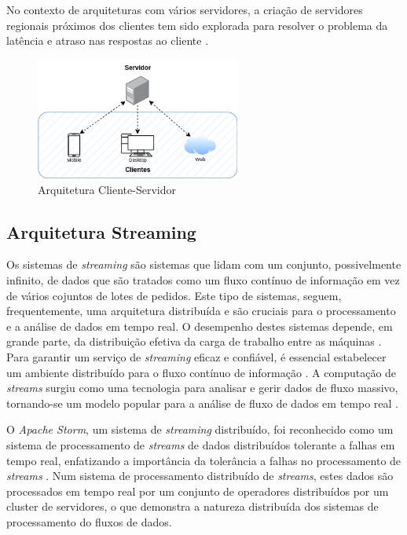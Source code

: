 No contexto de arquiteturas com vários servidores, a criação de servidores regionais próximos dos 
clientes tem sido explorada para resolver o problema da latência e atraso nas respostas ao cliente 
\cite{clientserver2022b}. 

\begin{figure}[H]
    \centering
    \includegraphics[width=0.6\textwidth]{media/content/estado-arte/client-server.png}
    \caption{Arquitetura Cliente-Servidor}
    \label{fig:client-server}
\end{figure}

\subsection{Arquitetura Streaming}

Os sistemas de \textit{streaming} são sistemas que lidam com um conjunto, possivelmente infinito, de
dados que são tratados como um fluxo contínuo de informação em vez de vários cojuntos de lotes de 
pedidos. Este tipo de sistemas, seguem, frequentemente, uma arquitetura distribuída e são cruciais 
para o processamento e a análise de dados em tempo real. O desempenho destes sistemas depende, 
em grande parte, da distribuição efetiva da carga de trabalho entre as máquinas \cite{stream2020}. 
Para garantir um serviço de \textit{streaming} eficaz e confiável, é essencial estabelecer um 
ambiente distribuído para o fluxo contínuo de informação \cite{stream2014}. A computação de 
\textit{streams} surgiu como uma tecnologia para analisar e gerir dados de fluxo massivo, 
tornando-se um modelo popular para a análise de fluxo de dados em tempo real 
\cite{stream2018} \cite{stream2018b}.

O \textit{Apache Storm}, um sistema de \textit{streaming} distribuído, foi reconhecido como um 
sistema de processamento de \textit{streams} de dados distribuídos tolerante a falhas em tempo real, 
enfatizando a importância da tolerância a falhas no processamento de \textit{streams} 
\cite{stormattwitter}. Num sistema de processamento distribuído de \textit{streams}, estes dados 
são processados em tempo real por um conjunto de operadores distribuídos por um \gls{cluster}
de servidores, o que demonstra a natureza distribuída dos sistemas de processamento do fluxos de dados.

